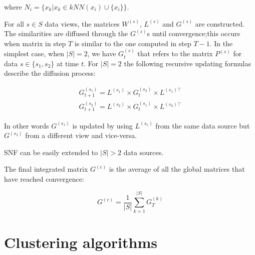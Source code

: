 where $N_i = \{ x_k | x_k \in kNN(x_i) \cup \{ x_i \}\}$. \newline


For all $s\in S$ data views, the matrices $W^{(s)}$, $L^{(s)}$ and $G^{(s)}$ are constructed. The similarities are diffused through the $G^{(s)}$s until convergence;this occurs when matrix in step $T$ is similar to the one computed in step $T-1$.  
In the simplest case, when $|S|=2$, we have $G_t^{(s)}$ that refers to the matrix $P^{(s)}$ for data $s \in \{ s_1,s_2\}$ at time $t$.
For $|S|=2$ the following recursive updating formulas describe the diffusion process:

\begin{equation}
    \label{eq:update}
    \begin{aligned}
        G^{(s_1)}_{t+1}=L^{(s_1)} \times G^{(s_2)}_{t} \times L^{(s_1)\top} \\
        G^{(s_2)}_{t+1}=L^{(s_2)} \times G^{(s_1)}_{t} \times L^{(s_2)\top}  
    \end{aligned}
\end{equation}

In other words $G^{(s_1)}$ is updated by using $L^{(s_1)}$ from the same data source but $G^{(s_2)}$ from a different view and vice-versa.

SNF can be easily extended to $|S| > 2$ data sources. \newline


The final integrated matrix $G^{(c)}$ is the average of all the global matrices that have reached convergence:

\begin{equation}
    \label{eq:consensus}
    G^{(c)} = \frac{1}{|S|} \sum_{k=1}^{|S|} G_T^{(k)}
\end{equation}


\section{Clustering algorithms}

